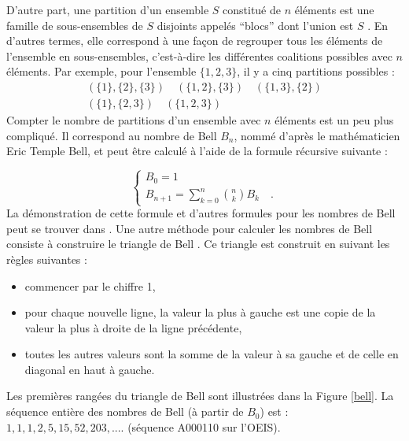 D'autre part, une partition d'un ensemble $S$ constitué de $n$ éléments est une famille de sous-ensembles de $S$ disjoints appelés ``blocs'' dont l'union est $S$ \cite{Rota1964}.
En d'autres termes, elle correspond à une façon de regrouper tous les éléments de l'ensemble en sous-ensembles, c'est-à-dire les différentes coalitions possibles avec $n$ éléments. Par exemple, pour l'ensemble $\{1,2,3\}$, il y a cinq partitions possibles :
\begin{gather*}
(\{1\},\{2\},\{3\}) \quad (\{1,2\},\{3\}) \quad (\{1,3\},\{2\}) \\
(\{1\},\{2,3\}) \quad  (\{1,2,3\})
\end{gather*}
Compter le nombre de partitions d'un ensemble avec $n$ éléments est un peu plus compliqué. Il correspond au nombre de Bell $B_n$, nommé d'après le mathématicien Eric Temple Bell, et peut être calculé à l'aide de la formule récursive suivante :

\begin{equation}
    \begin{cases}
         B_0 = 1\\
         B_{n+1} = \sum\limits_{k=0}^n \binom nk B_k \quad \text{.}
     \end{cases}
\end{equation}
La démonstration de cette formule et d'autres formules pour les nombres de Bell peut se trouver dans \cite{Graham1988, Rota1964}.
Une autre méthode pour calculer les nombres de Bell consiste à construire le triangle de Bell \cite{Aitken1933}. Ce triangle est construit en suivant les règles suivantes :
\begin{itemize}
\item commencer par le chiffre 1,
\item pour chaque nouvelle ligne, la valeur la plus à gauche est une copie de la valeur la plus à droite de la ligne précédente,
\item toutes les autres valeurs sont la somme de la valeur à sa gauche et de celle en diagonal en haut à gauche.
\end{itemize}
 Les premières rangées du triangle de Bell sont illustrées dans la Figure \ref{bell}. La séquence entière des nombres de Bell (à partir de $B_0$) est : $1, 1, 1, 2, 5, 15, 52, 203, ....$ (séquence A000110 sur l'OEIS).\\

